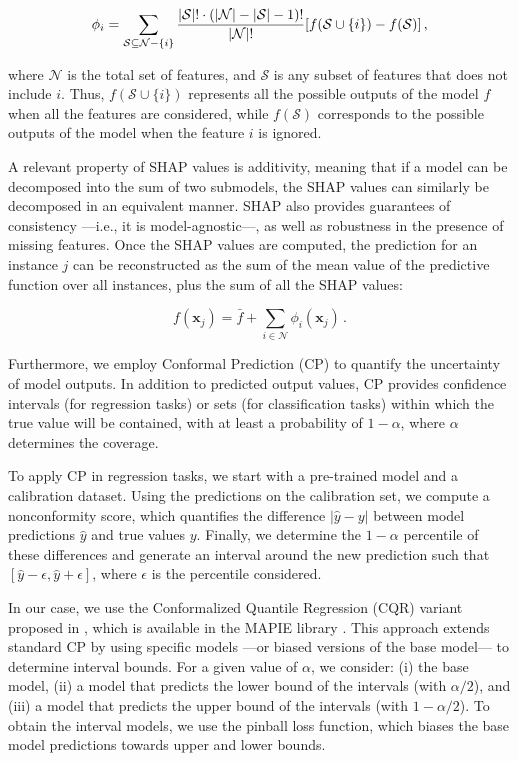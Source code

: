\documentclass[preprint,12pt]{elsarticle}
\begin{document}
\begin{equation}
    \phi_i = \sum_{\mathcal S \subseteq \mathcal N \\ - \{i\}} \frac{|\mathcal S|! \cdot (|\mathcal N| - |\mathcal S| -1)!}{|\mathcal N|!} [f(\mathcal S \cup \{i\}) - f(\mathcal S)]
    \,,
\end{equation}

where $\mathcal N$ is the total set of features, and $\mathcal S$ is any subset of features that does not include $i$. Thus, $f(\mathcal S \cup \{i\})$ represents all the possible outputs of the model $f$ when all the features are considered, while $f(\mathcal S)$ corresponds to the possible outputs of the model when the feature $i$ is ignored.

A relevant property of SHAP values is additivity, meaning that if a model can be decomposed into the sum of two submodels, the SHAP values can similarly be decomposed in an equivalent manner. SHAP also provides guarantees of consistency ---i.e., it is model-agnostic---, as well as robustness in the presence of missing features. Once the SHAP values are computed, the prediction for an instance $j$ can be reconstructed as the sum of the mean value of the predictive function over all instances, plus the sum of all the SHAP values:

\begin{equation}
    f(\mathbf{x}_j) = \bar{f} + \sum_{i\in\mathcal N} \phi_i(\mathbf{x}_j) \,.
\end{equation}

Furthermore, we employ Conformal Prediction (CP) \cite{angelopoulos2023conformal} to quantify the uncertainty of model outputs. In addition to predicted output values, CP provides confidence intervals (for regression tasks) or sets (for classification tasks) within which the true value will be contained, with at least a probability of $1 - \alpha$, where $\alpha$ determines the coverage.

To apply CP in regression tasks, we start with a pre-trained model and a calibration dataset.  Using the predictions on the calibration set, we compute a nonconformity score, which quantifies the difference $|\hat{y} - y|$ between model predictions $\hat{y}$ and true values $y$. Finally, we determine the $1 - \alpha$ percentile of these differences and generate an interval around the new prediction such that $[\hat{y} - \epsilon, \hat{y} + \epsilon ]$, where $\epsilon$ is the percentile considered.

In our case, we use the Conformalized Quantile Regression (CQR) variant proposed in \cite{romano2019conformalized}, which is available in the MAPIE library \cite{mapie2023}. This approach extends standard CP by using specific models ---or biased versions of the base model--- to determine interval bounds. For a given value of $\alpha$, we consider: (i) the base model, (ii) a model that predicts the lower bound of the intervals (with $\alpha / 2$), and (iii) a model that predicts the upper bound of the intervals (with $1 - \alpha / 2$). To obtain the interval models, we use the pinball loss function, which biases the base model predictions towards upper and lower bounds.
\end{document}
